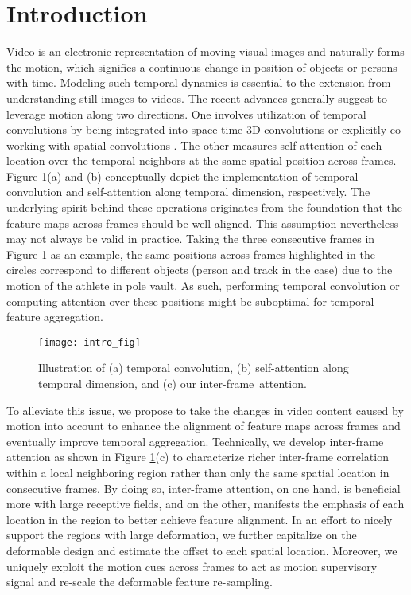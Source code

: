 \documentclass[10pt,twocolumn,letterpaper]{article}
\begin{document}
\section{Introduction}

Video is an electronic representation of moving visual images and naturally forms the motion, which signifies a continuous change in position of objects or persons with time. Modeling such temporal dynamics is essential to the extension from understanding still images to videos. The recent advances generally suggest to leverage motion along two directions. One involves utilization of temporal convolutions by being integrated into space-time 3D convolutions \cite{Ji:PAMI,Tran:ICCV15} or explicitly co-working with spatial convolutions \cite{Tran:CVPR18,Carreira:CVPR17,Xie:ECCV18}. The other measures self-attention of each location over the temporal neighbors at the same spatial position across frames. Figure \ref{fig1:1}(a) and (b) conceptually depict the implementation of temporal convolution and self-attention along temporal dimension, respectively. The underlying spirit behind these operations originates from the foundation that the feature maps across frames should be well aligned. This assumption nevertheless may not always be valid in practice. Taking the three consecutive frames in Figure \ref{fig1:1} as an example, the same positions across frames highlighted in the circles correspond to different objects (person and track in the case) due to the motion of the athlete in pole vault. As such, performing temporal convolution or computing attention over these positions might be suboptimal for temporal feature aggregation.

\begin{figure}[!tb]
      \vspace{-0.28in}
         \centering\texttt{[image: intro\_fig]}
         \vspace{-0.15in}
         \caption{\small Illustration of (a) temporal convolution, (b) self-attention along temporal dimension, and (c) our inter-frame~attention.}
         \label{fig1:1}
   \vspace{-0.30in}
\end{figure}


To alleviate this issue, we propose to take the changes in video content caused by motion into account to enhance the alignment of feature maps across frames and eventually improve temporal aggregation. Technically, we develop inter-frame attention as shown in Figure \ref{fig1:1}(c) to characterize richer inter-frame correlation within a local neighboring region rather than only the same spatial location in consecutive frames. By doing so, inter-frame attention, on one hand, is beneficial more with large receptive fields, and on the other, manifests the emphasis of each location in the region to better achieve feature alignment. In an effort to nicely support the regions with large deformation, we further capitalize on the deformable design and estimate the offset to each spatial location. Moreover, we uniquely exploit the motion cues across frames to act as motion supervisory signal and re-scale the deformable feature re-sampling.
\end{document}
